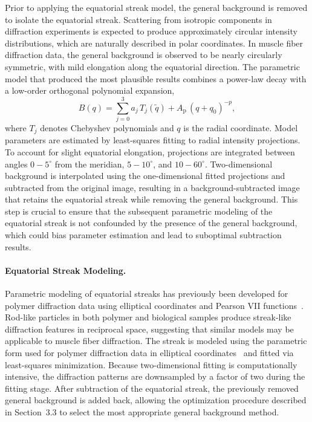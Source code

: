 \documentclass[iucr]{iucrjournals}
\begin{document}
Prior to applying the equatorial streak model, the general background is removed to isolate the equatorial streak. Scattering from isotropic components in diffraction experiments is expected to produce approximately circular intensity distributions, which are naturally described in polar coordinates. In muscle fiber diffraction data, the general background is observed to be nearly circularly symmetric, with mild elongation along the equatorial direction. The parametric model that produced the most plausible results combines a power-law decay with a low-order orthogonal polynomial expansion,
\begin{equation}
B(q) = \sum_{j=0}^{3} a_j\, T_j(\tilde q) + A_{\mathrm{p}}\, (q + q_0)^{-p},
\end{equation}
where $T_j$ denotes Chebyshev polynomials and $q$ is the radial coordinate. Model parameters are estimated by least-squares fitting to radial intensity projections. To account for slight equatorial elongation, projections are integrated between angles $0-5^{\circ}$ from the meridian, $5-10^{\circ}$, and $10-60^{\circ}$. Two-dimensional background is interpolated using the one-dimensional fitted projections and subtracted from the original image, resulting in a background-subtracted image that retains the equatorial streak while removing the general background. This step is crucial to ensure that the subsequent parametric modeling of the equatorial streak is not confounded by the presence of the general background, which could bias parameter estimation and lead to suboptimal subtraction results.

\paragraph{Equatorial Streak Modeling.}

Parametric modeling of equatorial streaks has previously been developed for polymer diffraction data using elliptical coordinates and Pearson VII functions~\cite{MurthyZeroGrubb1997}. Rod-like particles in both polymer and biological samples produce streak-like diffraction features in reciprocal space, suggesting that similar models may be applicable to muscle fiber diffraction. The streak is modeled using the parametric form used for polymer diffraction data in elliptical coordinates~\cite{MurthyZeroGrubb1997} and fitted via least-squares minimization. Because two-dimensional fitting is computationally intensive, the diffraction patterns are downsampled by a factor of two during the fitting stage. After subtraction of the equatorial streak, the previously removed general background is added back, allowing the optimization procedure described in Section~3.3 to select the most appropriate general background method.
\end{document}
